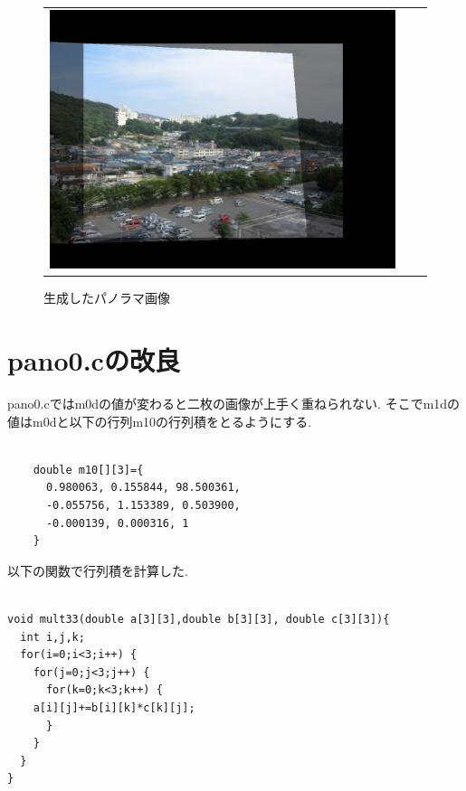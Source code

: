 \documentclass[a4j]{jarticle}
\begin{document}
\begin{figure}[htbp]
\begin{tabular}{ccc}
\begin{minipage}{0.4\hsize}
\includegraphics[bb=0 0 1024 768,scale=.15]{panoout.jpg}
\caption{生成したパノラマ画像}
\end{minipage}
\end{tabular}
\end{figure}

\section{pano0.cの改良}
pano0.cではm0dの値が変わると二枚の画像が上手く重ねられない. 
そこでm1dの値はm0dと以下の行列m10の行列積をとるようにする.
\begin{verbatim}

    double m10[][3]={
      0.980063, 0.155844, 98.500361,
      -0.055756, 1.153389, 0.503900,
      -0.000139, 0.000316, 1
    }

\end{verbatim}

以下の関数で行列積を計算した.　
\begin{verbatim}

void mult33(double a[3][3],double b[3][3], double c[3][3]){
  int i,j,k;
  for(i=0;i<3;i++) {
    for(j=0;j<3;j++) {
      for(k=0;k<3;k++) {
	a[i][j]+=b[i][k]*c[k][j];
      }
    }
  }
}

\end{verbatim}
\end{document}
